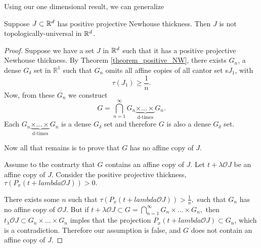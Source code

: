 
Using our one dimensional result, we can generalize 
\begin{theorem}Suppose $J \subset \mathbb{R}^d$ has positive projective Newhouse thickness. Then $J$ is not topologically-universal in $\mathbb{R}^d$.  
\end{theorem}

\begin{proof}  Suppose we have a set $J$ in $\mathbb{R}^d$ such that it has a positive projective Newhouse thickness.  By Theorem \ref{theorem_positive_NW}, there exists $G_n$, a dense $G_{\delta}$ set in ${\mathbb R}^1$ such that $G_n$ omits all affine copies of all cantor set s$J_1$, with $$\tau(J_1) \geq \frac{1}{n}.$$
Now, from these $G_n$ we construct
$$
G = \bigcap_{n=1}^\infty G_n\underbrace{\times \dots \times}_\text{d-times}G_n. 
$$
Each $G_n\underbrace{\times \dots \times}_\text{d-times}G_n $ is a dense $G_\delta$ set and therefore $G$ is also a dense $G_\delta$ set.  

Now all that remains is to prove that $G$ has no affine copy of $J$.  

Assume to the contrarty that $G$ contains an affine copy of $J.$  Let $t+\lambda \mathcal{O}J$ be an affine copy of $J$.  Consider the positive projective thickness, $\tau(P_x(t + lambda \mathcal{O}J))> 0.$

There exists some $n$ such that $\tau(P_x(t + lambda \mathcal{O}J))> \frac{1}{n},$ such that $G_n$ has no affine copy of $\mathcal{O}J$.  But if $t + \lambda \mathcal{O}J \subset G = \bigcap_{n=1}^\infty G_n \times \dots \times G_n,$ then $t_\lambda\mathcal{O}J \subset G_n \times \dots \times G_n$ imples that the projection $P_x(t + lambda \mathcal{O}J) \subset G_n$, which is a contradiction.  Therefore our assumption is false, and $G$ does not contain an affine copy of $J$.  
 





\end{proof}